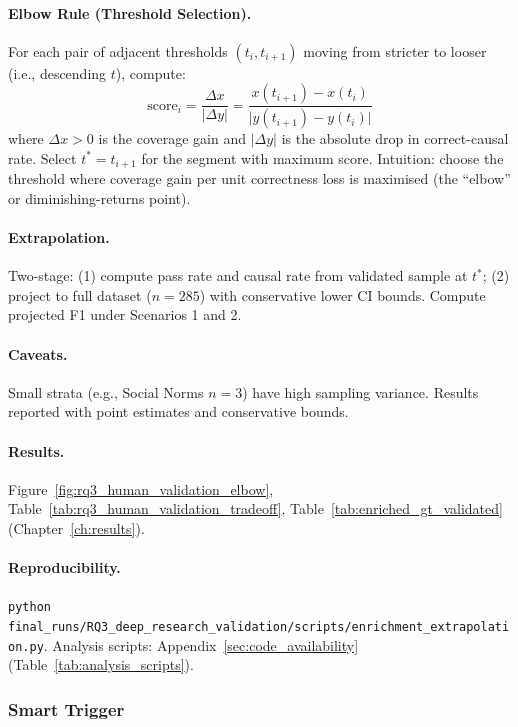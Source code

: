 \paragraph{Elbow Rule (Threshold Selection).}
For each pair of adjacent thresholds $(t_i, t_{i+1})$ moving from stricter to looser (i.e., descending $t$), compute:
\[
\text{score}_i = \frac{\Delta x}{\lvert \Delta y \rvert} = \frac{x(t_{i+1}) - x(t_i)}{\lvert y(t_{i+1}) - y(t_i) \rvert}
\]
where $\Delta x > 0$ is the coverage gain and $\lvert \Delta y \rvert$ is the absolute drop in correct-causal rate. Select $t^* = t_{i+1}$ for the segment with maximum score. Intuition: choose the threshold where coverage gain per unit correctness loss is maximised (the ``elbow'' or diminishing-returns point).

\paragraph{Extrapolation.}
Two-stage: (1) compute pass rate and causal rate from validated sample at $t^*$; (2) project to full dataset ($n=285$) with conservative lower CI bounds. Compute projected F1 under Scenarios 1 and 2.

\paragraph{Caveats.}
Small strata (e.g., Social Norms $n=3$) have high sampling variance. Results reported with point estimates and conservative bounds.

\paragraph{Results.}
Figure~\ref{fig:rq3_human_validation_elbow}, Table~\ref{tab:rq3_human_validation_tradeoff}, Table~\ref{tab:enriched_gt_validated} (Chapter~\ref{ch:results}).

\paragraph{Reproducibility.}
\texttt{python final\_runs/RQ3\_deep\_research\_validation/scripts/enrichment\_extrapolation.py}. Analysis scripts: Appendix~\ref{sec:code_availability} (Table~\ref{tab:analysis_scripts}).

\subsubsection{Smart Trigger}
\label{sec:rq3_smart_trigger}

